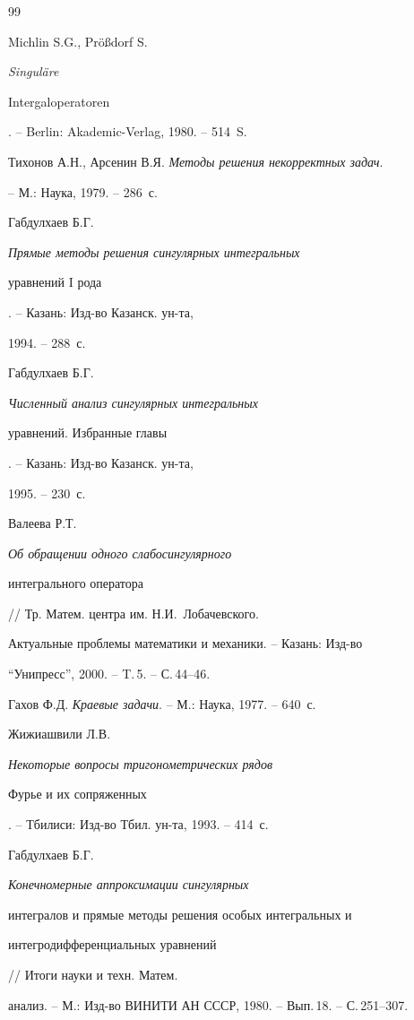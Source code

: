 \begin{thebibliography}{99}







Michlin S.G., Pr\"{o}\ss{}dorf S. {\em Singul\"{a}re


Intergaloperatoren}. -- Berlin: Akademic-Verlag, 1980. -- 514~S.




Тихонов А.Н., Арсенин В.Я. {\em Методы решения некорректных задач}.


-- М.: Наука, 1979. -- 286~с.




Габдулхаев Б.Г. {\em Прямые методы  решения сингулярных интегральных 


уравнений $\mathrm I$ рода}. -- Казань: Изд-во Казанск. ун-та,


1994. -- 288~с.




Габдулхаев Б.Г. {\em Численный анализ сингулярных интегральных


уравнений. Избранные главы}. -- Казань: Изд-во Казанск. ун-та, 


1995. -- 230~с.




Валеева Р.Т. {\em Об обращении одного слабосингулярного 


интегрального оператора} // Тр. Матем. центра им. Н.И.~Лобачевского.


Актуальные проблемы математики и механики. -- Казань: Изд-во


``Унипресс'', 2000. -- T.\,5. -- С.\,44--46.




Гахов Ф.Д. {\em Краевые задачи}. -- М.: Наука, 1977. -- 640~с.




Жижиашвили Л.В. {\em Некоторые вопросы тригонометрических рядов 


Фурье и их сопряженных}. -- Тбилиси: Изд-во Тбил. ун-та, 1993. -- 414~с.




Габдулхаев Б.Г. {\em Конечномерные аппроксимации сингулярных 


интегралов и прямые методы решения особых интегральных и 


интегродифференциальных уравнений} // Итоги науки и техн. Матем.


анализ. -- М.: Изд-во ВИНИТИ АН СССР, 1980. -- Вып.\,18. -- С.\,251--307.



\end{thebibliography}
